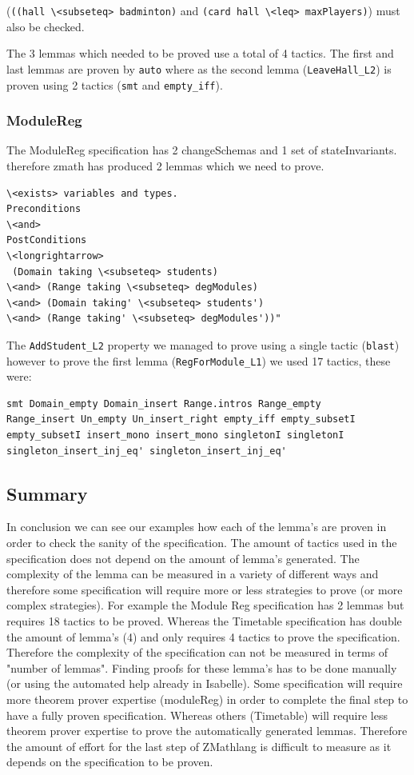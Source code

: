 (\verb|((hall \<subseteq> badminton)| and \verb|(card hall \<leq> maxPlayers)|)
must also be checked.

The 3 lemmas which needed to be proved use a total of 4 tactics. The first and
last lemmas are proven by \verb|auto| where as the second lemma
(\verb|LeaveHall_L2|) is proven using 2 tactics (\verb|smt| and
\verb|empty_iff|).

\subsubsection{ModuleReg}

The ModuleReg specification has 2 changeSchemas and 1 set of stateInvariants.
therefore \gls{zmath} has produced 2 lemmas which we need to prove.

\begin{verbatim}
\<exists> variables and types.
Preconditions
\<and>
PostConditions
\<longrightarrow>
 (Domain taking \<subseteq> students)
\<and> (Range taking \<subseteq> degModules)
\<and> (Domain taking' \<subseteq> students')
\<and> (Range taking' \<subseteq> degModules'))"
\end{verbatim}

The \verb|AddStudent_L2| property we managed to prove using a single tactic
(\verb|blast|) however to prove the first lemma (\verb|RegForModule_L1|) we used
17 tactics, these were:

\begin{verbatim}
smt Domain_empty Domain_insert Range.intros Range_empty 
Range_insert Un_empty Un_insert_right empty_iff empty_subsetI 
empty_subsetI insert_mono insert_mono singletonI singletonI 
singleton_insert_inj_eq' singleton_insert_inj_eq'
\end{verbatim}

\subsection{Summary}
In conclusion we can see our examples how each of the lemma's are proven in
order to check the sanity of the specification. The amount of tactics used in
the specification does not depend on the amount of lemma's generated. The
complexity of the lemma can be measured in a variety of different ways
\cite{complexityofproofs} and therefore some specification will require more or
less strategies to prove (or more complex strategies). For example the Module
Reg specification has 2 lemmas but requires 18 tactics to be proved. Whereas the
Timetable specification has double the amount of lemma's (4) and only requires 4
tactics to prove the specification. Therefore the complexity of the
specification can not be measured in terms of "number of lemmas".
Finding proofs for these lemma's has to be done manually (or using the automated
help already in Isabelle). Some specification will require more theorem prover
expertise (moduleReg) in order to complete the final step to have a fully proven
specification. Whereas others (Timetable) will require less theorem prover
expertise to prove  the automatically generated lemmas. Therefore the amount of effort for
the last step of ZMathlang is difficult to measure as it depends on the
specification to be proven.


